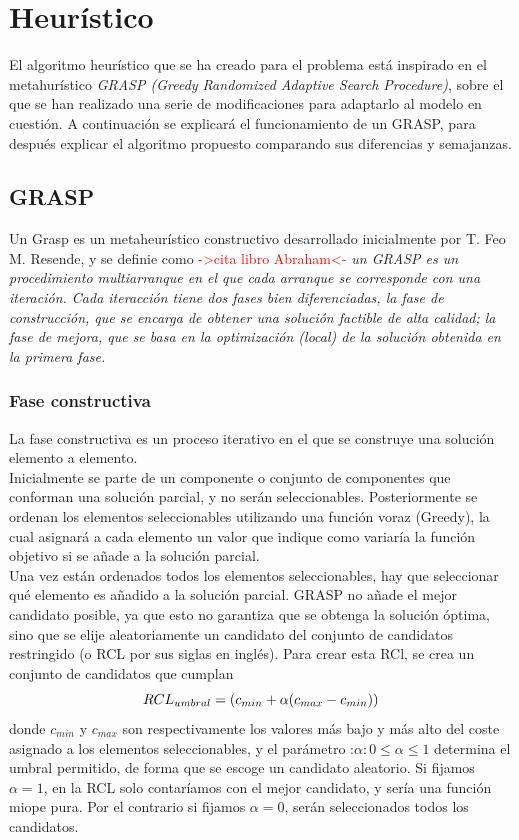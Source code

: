 \chapter{Heurístico}
El algoritmo heurístico que se ha creado para el problema está inspirado en el metahurístico \textit{GRASP (Greedy Randomized Adaptive Search Procedure)}, sobre el que se han realizado una serie de modificaciones para adaptarlo al modelo en cuestión. A continuación se explicará el funcionamiento de un GRASP, para después explicar el algoritmo propuesto comparando sus diferencias y semajanzas.

\section{GRASP}
Un Grasp es un metaheurístico constructivo desarrollado inicialmente por T. Feo   M. Resende, y se definie como \textcolor{red}{->cita libro Abraham<-} \textit{un GRASP es un procedimiento multiarranque en el que cada arranque se corresponde con una iteración. Cada iteracción tiene dos fases bien diferenciadas, la fase de construcción, que se encarga de obtener una solución factible de alta calidad; la fase de mejora, que se basa en la optimización (local) de la solución obtenida en la primera fase.}

\subsection{Fase constructiva}
La fase constructiva es un proceso iterativo en el que se construye una solución elemento a elemento.\\
Inicialmente se parte de un componente o conjunto de componentes que conforman una solución parcial, y no serán seleccionables. Posteriormente se ordenan los elementos seleccionables utilizando una función voraz (Greedy), la cual asignará a cada elemento un valor que indique como variaría la función objetivo si se añade a la solución parcial.\\
Una vez están ordenados todos los elementos seleccionables, hay que seleccionar qué elemento es añadido a la solución parcial. GRASP no añade el mejor candidato posible, ya que esto no garantiza que se obtenga la solución óptima, sino que se elije aleatoriamente un candidato del conjunto de candidatos restringido (o RCL por sus siglas en inglés). Para crear esta RCl, se crea un conjunto de candidatos que cumplan
\begin{equation}\\
{RCL}_{umbral} = (c_{min}+\alpha(c_{max} - c_{min} ))
\end{equation}
donde $c_{min}$ y $c_{max}$ son respectivamente los valores más bajo y más alto del coste asignado a los elementos seleccionables, y el parámetro  :$\alpha : 0\leq \alpha \leq1$ determina el umbral permitido, de forma que se escoge un candidato aleatorio. Si fijamos $\alpha=1$, en la RCL solo contaríamos con el mejor candidato, y sería una función miope pura. Por el contrario si fijamos $\alpha=0$, serán seleccionados todos los candidatos.\\

